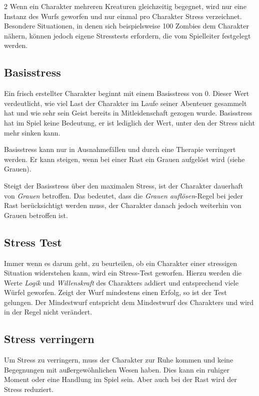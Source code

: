 \begin{multicols}{2}
Wenn ein Charakter mehreren Kreaturen gleichzeitig begegnet, wird nur eine Instanz des Wurfs geworfen und nur einmal pro Charakter Stress verzeichnet. Besondere Situationen, in denen sich beispielsweise 100 Zombies dem Charakter nähern, können jedoch eigene Stresstests erfordern, die vom Spielleiter festgelegt werden.

\subsection{Basisstress}

Ein frisch erstellter Charakter beginnt mit einem Basisstress von 0. Dieser Wert verdeutlicht, wie viel Last der Charakter im Laufe seiner Abenteuer gesammelt hat und wie sehr sein Geist bereits in Mitleidenschaft gezogen wurde. Basisstress hat im Spiel keine Bedeutung, er ist lediglich der Wert, unter den der Stress nicht mehr sinken kann.

Basisstress kann nur in Ausnahmefällen und durch eine Therapie verringert werden. Er kann steigen, wenn bei einer Rast ein Grauen aufgelöst wird (siehe Grauen).

Steigt der Basisstress über den maximalen Stress, ist der Charakter dauerhaft von \textit{Grauen} betroffen. Das bedeutet, dass die \textit{Grauen auflösen}-Regel bei jeder Rast berücksichtigt werden muss, der Charakter danach jedoch weiterhin von Grauen betroffen ist.

\subsection{Stress Test}

Immer wenn es darum geht, zu beurteilen, ob ein Charakter einer stressigen Situation widerstehen kann, wird ein Stress-Test geworfen. Hierzu werden die Werte \textit{Logik} und \textit{Willenskraft} des Charakters addiert und entsprechend viele Würfel geworfen. Zeigt der Wurf mindestens einen Erfolg, so ist der Test gelungen. Der Mindestwurf entspricht dem Mindestwurf des Charakters und wird in der Regel nicht verändert.

\subsection{Stress verringern}

Um Stress zu verringern, muss der Charakter zur Ruhe kommen und keine Begegnungen mit außergewöhnlichen Wesen haben. Dies kann ein ruhiger Moment oder eine Handlung im Spiel sein. Aber auch bei der Rast wird der Stress reduziert.


\end{multicols}
